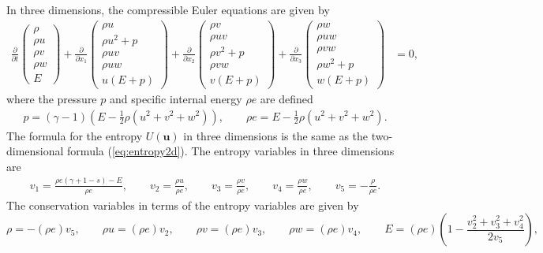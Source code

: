 \documentclass[preprint,10pt]{article}
\theoremstyle{definition}
\theoremstyle{lemma}
\theoremstyle{theorem}
\theoremstyle{assumption}
\newcommand{\pd}[2]{\frac{\partial#1}{\partial#2}}
\newcommand{\LRp}[1]{\left( #1 \right)}
\begin{document}
{In three dimensions, the compressible Euler equations are given by
\begin{align}
\pd{}{t}\LRp{\begin{array}{c}
\rho\\
\rho u\\
\rho v\\
\rho w\\
E
\end{array}} +
\pd{}{x_1}\LRp{\begin{array}{c}
\rho u\\
\rho u^2+p\\
\rho uv\\
\rho uw\\
u(E+p)
\end{array}} + \pd{}{x_2}\LRp{\begin{array}{c}
\rho v\\
\rho uv\\
\rho v^2+p\\
\rho vw\\
v(E+p)
\end{array}}  + \pd{}{x_3}\LRp{\begin{array}{c}
\rho w\\
\rho uw\\
\rho vw\\
\rho w^2+p\\
w(E+p)
\end{array}} &= 0,
\label{eq:euler3d}
\end{align}
where the pressure $p$ and specific internal energy $\rho e$ are defined 
\begin{align}
p = (\gamma-1)\LRp{E - \frac{1}{2}\rho (u^2+v^2+w^2)}, \qquad \rho e = E - \frac{1}{2}\rho (u^2+v^2+w^2).  
\label{eq:pressure3d}
\end{align}
The formula for the entropy $U(\bm{u})$ in three dimensions is the same as the two-dimensional formula (\ref{eq:entropy2d}).  
 The entropy variables in three dimensions are 
\begin{align}
v_1 = \frac{\rho e (\gamma + 1 - s) - E}{\rho e}, \qquad v_2 = \frac{\rho u}{\rho e}, \qquad v_3 = \frac{\rho v}{\rho e}, \qquad v_4 = \frac{\rho w}{\rho e}, \qquad v_5 = -\frac{\rho}{\rho e}.
\end{align}
The conservation variables in terms of the entropy variables are given by
\begin{equation}
\rho = -(\rho e) v_5, \qquad \rho u = (\rho e) v_2, \qquad \rho v = (\rho e) v_3, \qquad \rho w = (\rho e) v_4, \qquad E = (\rho e)\LRp{1 - \frac{{v_2^2+v_3^2+v_4^2}}{2 v_5}},

\end{equation}}
\end{document}
